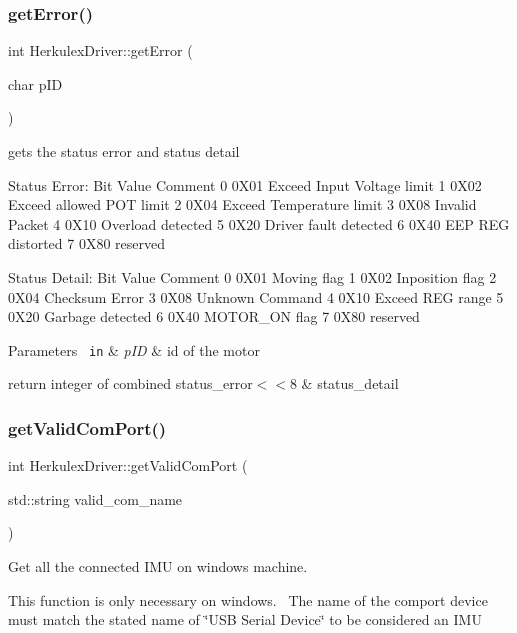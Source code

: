 \subsubsection{\texorpdfstring{getError()}{getError()}}
{\footnotesize\ttfamily int Herkulex\+Driver\+::get\+Error (\begin{DoxyParamCaption}\item[{char}]{p\+ID }\end{DoxyParamCaption})}

gets the status error and status detail

Status Error\+: Bit Value Comment 0 0X01 Exceed Input Voltage limit 1 0X02 Exceed allowed P\+OT limit 2 0X04 Exceed Temperature limit 3 0X08 Invalid Packet 4 0X10 Overload detected 5 0X20 Driver fault detected 6 0X40 E\+EP R\+EG distorted 7 0X80 reserved

Status Detail\+: Bit Value Comment 0 0X01 Moving flag 1 0X02 Inposition flag 2 0X04 Checksum Error 3 0X08 Unknown Command 4 0X10 Exceed R\+EG range 5 0X20 Garbage detected 6 0X40 M\+O\+T\+O\+R\+\_\+\+ON flag 7 0X80 reserved


\begin{DoxyParams}[1]{Parameters}
\mbox{\texttt{ in}}  & {\em p\+ID} & id of the motor\\
\hline
\end{DoxyParams}
return integer of combined status\+\_\+error$<$$<$8 \& status\+\_\+detail \mbox{\label{class_herkulex_driver_a88fc6f6f61129cd1f8133b4d263bf6cc}} 
\subsubsection{\texorpdfstring{getValidComPort()}{getValidComPort()}}
{\footnotesize\ttfamily int Herkulex\+Driver\+::get\+Valid\+Com\+Port (\begin{DoxyParamCaption}\item[{std\+::string}]{valid\+\_\+com\+\_\+name }\end{DoxyParamCaption})\hspace{0.3cm}{\ttfamily [private]}}



Get all the connected I\+MU on windows machine. 

This function is only necessary on windows.~\newline
The name of the comport device must match the stated name of \char`\"{}\+U\+S\+B Serial Device\char`\"{} to be considered an I\+MU


